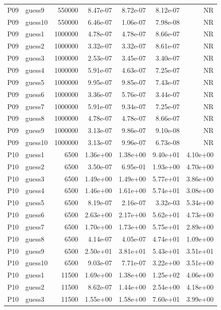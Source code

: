 {\begin{longtable}{llrrrrr}
P09 & guess9 & 550000 & 8.47e-07 & 8.72e-07 & 8.12e-07 & NR \\
P09 & guess10 & 550000 & 6.46e-07 & 1.06e-07 & 7.98e-08 & NR \\
P09 & guess1 & 1000000 & 4.78e-07 & 4.78e-07 & 8.66e-07 & NR \\
P09 & guess2 & 1000000 & 3.32e-07 & 3.32e-07 & 8.61e-07 & NR \\
P09 & guess3 & 1000000 & 2.53e-07 & 3.45e-07 & 3.40e-07 & NR \\
P09 & guess4 & 1000000 & 5.91e-07 & 4.63e-07 & 7.25e-07 & NR \\
P09 & guess5 & 1000000 & 9.95e-07 & 9.85e-07 & 7.43e-07 & NR \\
P09 & guess6 & 1000000 & 3.36e-07 & 5.76e-07 & 3.44e-07 & NR \\
P09 & guess7 & 1000000 & 5.91e-07 & 9.34e-07 & 7.25e-07 & NR \\
P09 & guess8 & 1000000 & 4.78e-07 & 4.78e-07 & 8.66e-07 & NR \\
P09 & guess9 & 1000000 & 3.13e-07 & 9.86e-07 & 9.10e-08 & NR \\
P09 & guess10 & 1000000 & 3.13e-07 & 9.96e-07 & 6.73e-08 & NR \\
P10 & guess1 & 6500 & 1.36e+00 & 1.38e+00 & 9.40e+01 & 4.10e+00 \\
P10 & guess2 & 6500 & 3.50e-07 & 6.95e-01 & 1.93e+00 & 4.70e+00 \\
P10 & guess3 & 6500 & 1.49e+00 & 1.49e+00 & 5.77e+01 & 3.86e+00 \\
P10 & guess4 & 6500 & 1.46e+00 & 1.61e+00 & 5.74e+01 & 3.08e+00 \\
P10 & guess5 & 6500 & 8.19e-07 & 2.16e-07 & 3.32e-03 & 5.34e+00 \\
P10 & guess6 & 6500 & 2.63e+00 & 2.17e+00 & 5.62e+01 & 4.73e+00 \\
P10 & guess7 & 6500 & 1.70e+00 & 1.73e+00 & 5.75e+01 & 2.89e+00 \\
P10 & guess8 & 6500 & 4.14e-07 & 4.05e-07 & 4.74e+01 & 1.09e+00 \\
P10 & guess9 & 6500 & 2.50e+01 & 3.81e+01 & 5.43e+01 & 3.51e+01 \\
P10 & guess10 & 6500 & 9.03e-07 & 7.71e-07 & 3.22e+00 & 3.51e+00 \\
P10 & guess1 & 11500 & 1.69e+00 & 1.38e+00 & 1.25e+02 & 4.06e+00 \\
P10 & guess2 & 11500 & 8.62e-07 & 1.44e+00 & 2.54e+00 & 4.18e+00 \\
P10 & guess3 & 11500 & 1.55e+00 & 1.58e+00 & 7.60e+01 & 3.99e+00 \\

\end{longtable}}
